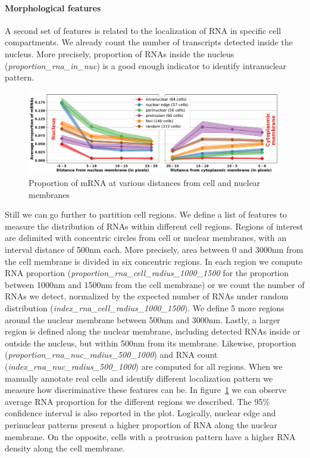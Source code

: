 \paragraph{Morphological features}

A second set of features is related to the localization of \ac{RNA} in specific cell compartments.
We already count the number of transcripts detected inside the nucleus.
More precisely, proportion of \ac{RNA}s inside the nucleus (\emph{proportion\_rna\_in\_nuc}) is a good enough indicator to identify intranuclear pattern.

\begin{figure}[h]
    \centering
    \includegraphics[width=1\textwidth]{figures/chapter4/plot_topography}
    \caption{Proportion of \ac{mRNA} at various distances from cell and nuclear membranes}
    \label{fig:features_topography}
\end{figure}

Still we can go further to partition cell regions.
We define a list of features to measure the distribution of \ac{RNA}s within different cell regions.
Regions of interest are delimited with concentric circles from cell or nuclear membranes, with an interval distance of 500nm each.
More precisely, area between 0 and 3000nm from the cell membrane is divided in six concentric regions.
In each region we compute \ac{RNA} proportion (\emph{proportion\_rna\_cell\_radius\_1000\_1500} for the proportion between 1000nm and 1500nm from the cell membrane) or we count the number of \ac{RNA}s we detect, normalized by the expected number of \ac{RNA}s under random distribution (\emph{index\_rna\_cell\_radius\_1000\_1500}).
We define 5 more regions around the nuclear membrane between 500nm and 3000nm.
Lastly, a larger region is defined along the nuclear membrane, including detected \ac{RNA}s inside or outside the nucleus, but within 500nm from its membrane.
Likewise, proportion (\emph{proportion\_rna\_nuc\_radius\_500\_1000}) and \ac{RNA} count (\emph{index\_rna\_nuc\_radius\_500\_1000}) are computed for all regions.
When we manually annotate real cells and identify different localization pattern we measure how discriminative these features can be.
In figure~\ref{fig:features_topography} we can observe average \ac{RNA} proportion for the different regions we described.
The 95\% confidence interval is also reported in the plot.
Logically, nuclear edge and perinuclear patterns present a higher proportion of \ac{RNA} along the nuclear membrane.
On the opposite, cells with a protrusion pattern have a higher \ac{RNA} density along the cell membrane.

